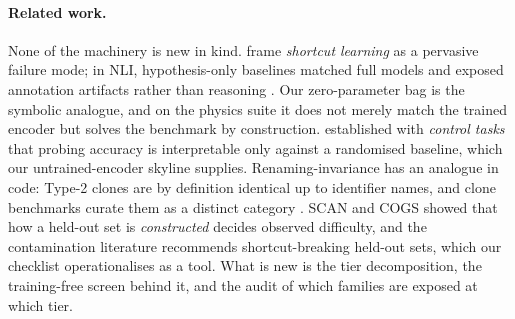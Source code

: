 \paragraph{Related work.} None of the machinery is new in kind. \citet{geirhos2020shortcut} frame
\emph{shortcut learning} as a pervasive failure mode; in NLI, hypothesis-only baselines matched full
models and exposed annotation artifacts rather than reasoning
\citep{gururangan2018annotation, poliak2018hypothesis}. Our zero-parameter bag is the symbolic
analogue, and on the physics suite it does not merely match the trained encoder but solves the
benchmark by construction. \citet{hewitt2019control} established with \emph{control tasks} that
probing accuracy is interpretable only against a randomised baseline, which our untrained-encoder
skyline supplies. Renaming-invariance has an analogue in code: Type-2 clones are by definition
identical up to identifier names, and clone benchmarks curate them as a distinct category
\citep{svajlenko2014towards}. SCAN \citep{lake2018generalization} and COGS \citep{kim2020cogs}
showed that how a held-out set is \emph{constructed} decides observed difficulty, and the
contamination literature \citep{jacovi2023stop, zhou2023don} recommends shortcut-breaking held-out
sets, which our checklist operationalises as a tool. What is new is the tier decomposition, the
training-free screen behind it, and the audit of which families are exposed at which tier.
